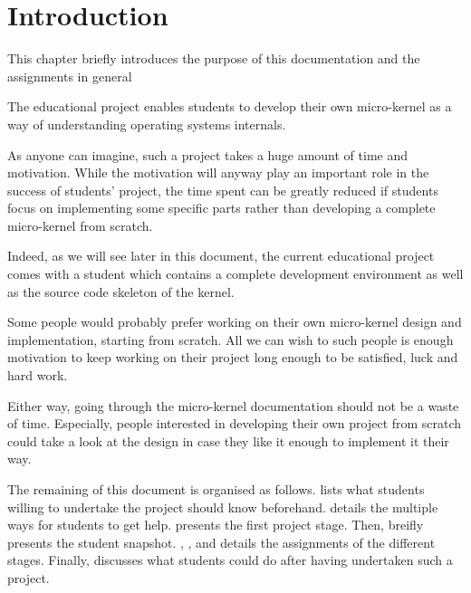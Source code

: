 %
%
%
%
%
%

%
%

\chapter{Introduction}
\label{chapter:introduction}

This chapter briefly introduces the purpose of this documentation
and the assignments in general

\newpage

%
%

The  educational project enables students to develop their own
micro-kernel as a way of understanding operating systems internals.

As anyone can imagine, such a project takes a huge amount of time and
motivation. While the motivation will anyway play an important role in the
success of students' project, the time spent can be greatly reduced if
students focus on implementing some specific parts rather than developing a
complete micro-kernel from scratch.

Indeed, as we will see later in this document, the current 
educational project comes with a student  which contains
a complete development environment as well as the source code skeleton of
the kernel.

Some people would probably prefer working on their own micro-kernel design
and implementation, starting from scratch. All we can wish to such people
is enough motivation to keep working on their project long enough to be
satisfied, luck and hard work.

Either way, going through the  micro-kernel documentation
should not be a waste of time. Especially, people interested in developing
their own project from scratch could take a look at the  design
in case they like it enough to implement it their way.

The remaining of this document is organised as follows.  lists what students willing to undertake the
project should know beforehand. 
details the multiple ways for students to get help.  presents the first project stage. Then,  breifly presents the student snapshot.
, ,
 and  details the assignments of the different stages. Finally,
 discusses what students could do
after having undertaken such a project.
